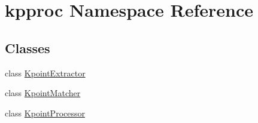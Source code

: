 \hypertarget{namespacekpproc}{}\section{kpproc Namespace Reference}
\label{namespacekpproc}
\subsection*{Classes}
\begin{DoxyCompactItemize}
\item 
class \hyperlink{classkpproc_1_1KpointExtractor}{Kpoint\+Extractor}
\item 
class \hyperlink{classkpproc_1_1KpointMatcher}{Kpoint\+Matcher}
\item 
class \hyperlink{classkpproc_1_1KpointProcessor}{Kpoint\+Processor}
\end{DoxyCompactItemize}
